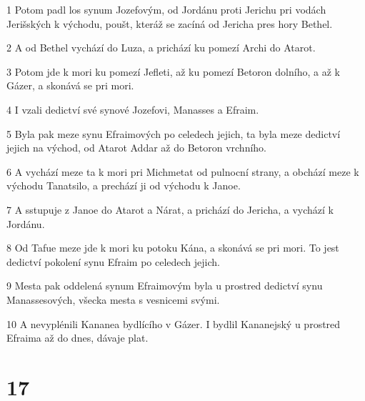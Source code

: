 \par 1 Potom padl los synum Jozefovým, od Jordánu proti Jerichu pri vodách Jerišských k východu, poušt, kteráž se zacíná od Jericha pres hory Bethel.
\par 2 A od Bethel vychází do Luza, a prichází ku pomezí Archi do Atarot.
\par 3 Potom jde k mori ku pomezí Jefleti, až ku pomezí Betoron dolního, a až k Gázer, a skonává se pri mori.
\par 4 I vzali dedictví své synové Jozefovi, Manasses a Efraim.
\par 5 Byla pak meze synu Efraimových po celedech jejich, ta byla meze dedictví jejich na východ, od Atarot Addar až do Betoron vrchního.
\par 6 A vychází meze ta k mori pri Michmetat od pulnocní strany, a obchází meze k východu Tanatsilo, a prechází ji od východu k Janoe.
\par 7 A sstupuje z Janoe do Atarot a Nárat, a prichází do Jericha, a vychází k Jordánu.
\par 8 Od Tafue meze jde k mori ku potoku Kána, a skonává se pri mori. To jest dedictví pokolení synu Efraim po celedech jejich.
\par 9 Mesta pak oddelená synum Efraimovým byla u prostred dedictví synu Manassesových, všecka mesta s vesnicemi svými.
\par 10 A nevyplénili Kananea bydlícího v Gázer. I bydlil Kananejský u prostred Efraima až do dnes, dávaje plat.

\chapter{17}

